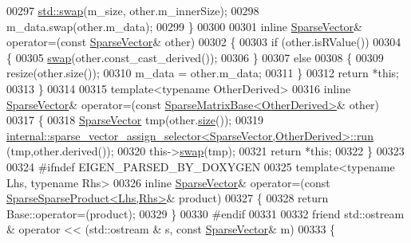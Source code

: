 \begin{DoxyCode}
00297       \hyperlink{endian_8c_a3ca5ecd34b04d6a243c054ac3a57f68d}{std::swap}(m\_size, other.m\_innerSize);
00298       m\_data.swap(other.m\_data);
00299     \}
00300 
00301     \textcolor{keyword}{inline} \hyperlink{group___sparse_core___module_class_eigen_1_1_sparse_vector}{SparseVector}& operator=(\textcolor{keyword}{const} \hyperlink{group___sparse_core___module_class_eigen_1_1_sparse_vector}{SparseVector}& other)
00302     \{
00303       \textcolor{keywordflow}{if} (other.isRValue())
00304       \{
00305         \hyperlink{endian_8c_a3ca5ecd34b04d6a243c054ac3a57f68d}{swap}(other.const\_cast\_derived());
00306       \}
00307       \textcolor{keywordflow}{else}
00308       \{
00309         resize(other.size());
00310         m\_data = other.m\_data;
00311       \}
00312       \textcolor{keywordflow}{return} *\textcolor{keyword}{this};
00313     \}
00314 
00315     \textcolor{keyword}{template}<\textcolor{keyword}{typename} OtherDerived>
00316     \textcolor{keyword}{inline} \hyperlink{group___sparse_core___module_class_eigen_1_1_sparse_vector}{SparseVector}& operator=(\textcolor{keyword}{const} 
      \hyperlink{group___sparse_core___module_class_eigen_1_1_sparse_matrix_base}{SparseMatrixBase<OtherDerived>}& other)
00317     \{
00318       \hyperlink{group___sparse_core___module_class_eigen_1_1_sparse_vector}{SparseVector} tmp(other.\hyperlink{group___sparse_core___module_a124bc57921775eb9aa2dfd9727e23472}{size}());
00319       \hyperlink{struct_eigen_1_1internal_1_1sparse__vector__assign__selector}{internal::sparse\_vector\_assign\_selector<SparseVector,OtherDerived>::run}
      (tmp,other.derived());
00320       this->\hyperlink{endian_8c_a3ca5ecd34b04d6a243c054ac3a57f68d}{swap}(tmp);
00321       \textcolor{keywordflow}{return} *\textcolor{keyword}{this};
00322     \}
00323 
00324 \textcolor{preprocessor}{    #ifndef EIGEN\_PARSED\_BY\_DOXYGEN}
00325     \textcolor{keyword}{template}<\textcolor{keyword}{typename} Lhs, \textcolor{keyword}{typename} Rhs>
00326     \textcolor{keyword}{inline} \hyperlink{group___sparse_core___module_class_eigen_1_1_sparse_vector}{SparseVector}& operator=(\textcolor{keyword}{const} 
      \hyperlink{class_eigen_1_1_sparse_sparse_product}{SparseSparseProduct<Lhs,Rhs>}& product)
00327     \{
00328       \textcolor{keywordflow}{return} Base::operator=(product);
00329     \}
00330 \textcolor{preprocessor}{    #endif}
00331 
00332     \textcolor{keyword}{friend} std::ostream & operator << (std::ostream & s, \textcolor{keyword}{const} \hyperlink{group___sparse_core___module_class_eigen_1_1_sparse_vector}{SparseVector}& m)
00333     \{

\end{DoxyCode}
